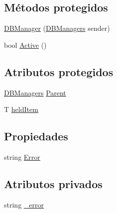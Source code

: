 \subsection*{Métodos protegidos}
\begin{DoxyCompactItemize}
\item 
\hyperlink{class_proyecto___integrador__3_1_1_d_b_managers_1_1_d_b_manager_3_01_t_01_4_afc677f4083b556311e37ad8a42cb8dd8}{D\-B\-Manager} (\hyperlink{class_proyecto___integrador__3_1_1_d_b_managers}{D\-B\-Managers} sender)
\item 
bool \hyperlink{class_proyecto___integrador__3_1_1_d_b_managers_1_1_d_b_manager_3_01_t_01_4_add66e324cef43fd10b491bc697fa60b5}{Active} ()
\end{DoxyCompactItemize}
\subsection*{Atributos protegidos}
\begin{DoxyCompactItemize}
\item 
\hyperlink{class_proyecto___integrador__3_1_1_d_b_managers}{D\-B\-Managers} \hyperlink{class_proyecto___integrador__3_1_1_d_b_managers_1_1_d_b_manager_3_01_t_01_4_a06315e75298c8f2fd46f32dc7c9a80b2}{Parent}
\item 
T \hyperlink{class_proyecto___integrador__3_1_1_d_b_managers_1_1_d_b_manager_3_01_t_01_4_a3b67ae3b5b3b9c3793d56c1407d7dcff}{held\-Item}
\end{DoxyCompactItemize}
\subsection*{Propiedades}
\begin{DoxyCompactItemize}
\item 
string \hyperlink{class_proyecto___integrador__3_1_1_d_b_managers_1_1_d_b_manager_3_01_t_01_4_a6e5caaed2ee1a4d067dfbf5aaa1b1fa8}{Error}
\end{DoxyCompactItemize}
\subsection*{Atributos privados}
\begin{DoxyCompactItemize}
\item 
string \hyperlink{class_proyecto___integrador__3_1_1_d_b_managers_1_1_d_b_manager_3_01_t_01_4_a72ee684c84a301ba5a3c48f863bc950f}{\-\_\-error}
\end{DoxyCompactItemize}


